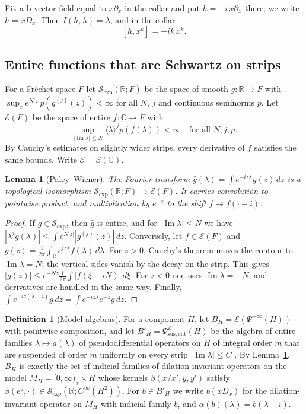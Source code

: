 \documentclass[11pt,oneside,reqno]{article}
\newcommand{\C}{\mathbb C}
\newcommand{\Z}{\mathbb Z}
\newcommand{\cE}{\mathcal E}
\newcommand{\Sexp}{\mathcal S_{\exp}}
\theoremstyle{plain}
\newtheorem{lemma}[theorem]{Lemma}
\theoremstyle{definition}
\newtheorem{definition}[theorem]{Definition}
\theoremstyle{remark}
\begin{document}
Fix a b-vector field equal to \(x\partial_x\) in the collar and put
\(h=-i\,x\partial_x\) there; we write \(h=xD_x\). Then
\(I(h,\lambda)=\lambda\), and in the collar
\begin{equation}\label{eq:weightcomm}
 [h,x^k]=-ik\,x^k .
\end{equation}

\subsection{Entire functions that are Schwartz on strips}
For a Fréchet space \(F\) let \(\Sexp(\mathbb R;F)\) be the space of smooth
\(g:\mathbb R\to F\) with \(\sup_ze^{N|z|}p(g^{(j)}(z))<\infty\) for all
\(N\), \(j\) and continuous seminorms \(p\). Let \(\cE(F)\) be the space of
entire \(f:\C\to F\) with
\[
 \sup_{|\operatorname{Im}\lambda|\leq N}\langle\lambda\rangle^jp(f(\lambda))
 <\infty\quad\text{for all }N,j,p .
\]
By Cauchy's estimates on slightly wider strips, every derivative of \(f\) satisfies the same
bounds. Write \(\cE=\cE(\C)\).

\begin{lemma}[Paley--Wiener]\label{lem:PW}
The Fourier transform \(\widehat g(\lambda)=\int e^{-iz\lambda}g(z)\,dz\) is a
topological isomorphism \(\Sexp(\mathbb R;F)\to\cE(F)\). It carries
convolution to pointwise product, and multiplication by \(e^{-z}\) to the
shift \(f\mapsto f(\cdot-i)\).
\end{lemma}

\begin{proof}
If \(g\in\Sexp\), then \(\widehat g\) is entire, and for
\(|\operatorname{Im}\lambda|\leq N\) we have
\(|\lambda^j\widehat g(\lambda)|\leq\int e^{N|z|}|g^{(j)}(z)|\,dz\).
Conversely, let \(f\in\cE(F)\) and
\(g(z)=\frac1{2\pi}\int_{\mathbb R}e^{iz\lambda}f(\lambda)\,d\lambda\). For
\(z>0\), Cauchy's theorem moves the contour to
\(\operatorname{Im}\lambda=N\); the vertical sides vanish by the decay on
the strip. This gives \(|g(z)|\leq e^{-Nz}\frac1{2\pi}\int|f(\xi+iN)|\,d\xi\).
For \(z<0\) one uses \(\operatorname{Im}\lambda=-N\), and derivatives are
handled in the same way. Finally,
\(\int e^{-iz(\lambda-i)}g\,dz=\int e^{-iz\lambda}e^{-z}g\,dz\).
\end{proof}

\begin{definition}[Model algebras]\label{def:model}
For a component \(H\), let \(B_H=\cE(\Psi^{-\infty}(H))\) with pointwise
composition, and let \(B'_H=\Psi^{\Z}_{\mathrm{sus,ent}}(H)\) be the algebra
of entire families \(\lambda\mapsto a(\lambda)\) of pseudodifferential
operators on \(H\) of integral order \(m\) that are suspended of order \(m\)
uniformly on every strip \(|\operatorname{Im}\lambda|\leq C\)
\cite{Notes,MelroseEta}. By Lemma~\ref{lem:PW}, \(B_H\) is exactly the set
of indicial families of dilation-invariant operators on the model
\(M_H=[0,\infty)_x\times H\) whose kernels \(\beta(x/x',y,y')\) satisfy
\(\beta(e^z,\cdot)\in\Sexp(\mathbb R;C^\infty(H^2))\). For
\(b\in B'_H\) we write \(b(xD_x)\) for the dilation-invariant operator on
\(M_H\) with indicial family \(b\), and \(\alpha(b)(\lambda)=b(\lambda-i)\).
\end{definition}
\end{document}

